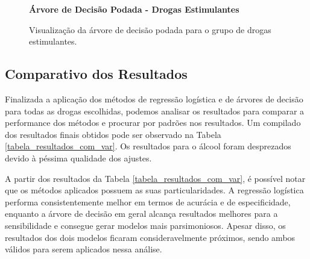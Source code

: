 \documentclass[
	article,			%
	11pt,				%
	oneside,			%
	a4paper,			%
	english,			%
	brazil,				%
	sumario=tradicional
	]{abntex2}
\begin{document}
\begin{figure}[H]
    \centering
    \textbf{Árvore de Decisão Podada - Drogas Estimulantes}\par\medskip
    \caption{Visualização da árvore de decisão podada para o grupo de drogas estimulantes.}
    \label{fig_DTStimulating_podada}
\end{figure}

% 

\subsection{Comparativo dos Resultados}

Finalizada a aplicação dos métodos de regressão logística e de árvores de decisão para todas as drogas escolhidas, podemos analisar os resultados para comparar a performance dos métodos e procurar por padrões nos resultados. Um compilado dos resultados finais obtidos pode ser observado na Tabela \ref{tabela_resultados_com_var}. Os resultados para o álcool foram desprezados devido à péssima qualidade dos ajustes.



A partir dos resultados da Tabela \ref{tabela_resultados_com_var}, é possível notar que os métodos aplicados possuem as suas particularidades. A regressão logística performa consistentemente melhor em termos de acurácia e de especificidade, enquanto a árvore de decisão em geral alcança resultados melhores para a sensibilidade e consegue gerar modelos mais parsimoniosos. Apesar disso, os resultados dos dois modelos ficaram consideravelmente próximos, sendo ambos válidos para serem aplicados nessa análise.
\end{document}
